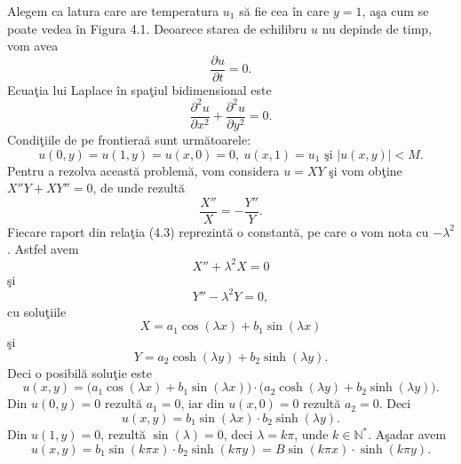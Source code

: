 \documentclass[a4paper,openany,12pt]{report}
\begin{document}
Alegem ca latura care are temperatura $u_1$ s\u a fie cea \^ in care $y=1$, a\c sa cum se poate vedea \^ in Figura 4.1. Deoarece starea de echilibru $u$ nu depinde de timp, vom avea
\begin{equation*}
\frac{\partial u}{\partial t}=0.
\end{equation*}
Ecua\c tia lui Laplace \^ in spa\c tiul bidimensional este
\begin{equation*}
\frac{\partial^2u}{\partial x^2}+\frac{\partial^2u}{\partial y^2}=0.
\end{equation*}
Condi\c tiile de pe frontiera\u a sunt urm\u atoarele:
\begin{equation*}
u(0,y)=u(1,y)=u(x,0)=0,\:  u(x, 1)=u_1 \text{ \c si } \left|u(x,y)\right|<M.
\end{equation*}
Pentru a rezolva aceast\u a problem\u a, vom considera $u=XY$ \c si vom ob\c tine $X''Y+XY''=0$, de unde rezult\u a
\begin{equation}
\frac{X''}{X}=-\frac{Y''}{Y}.
\end{equation}
Fiecare raport din rela\c tia (4.3) reprezint\u a o constant\u a, pe care o vom nota cu $-\lambda^2$. Astfel avem
\begin{equation*}
X''+\lambda^2X=0
\end{equation*}
\c si 
\begin{equation*}
Y''-\lambda^2Y=0, 
\end{equation*}
cu solu\c tiile
\begin{equation*}
X=a_1\cos(\lambda x)+b_1 \sin(\lambda x)
\end{equation*}
\c si 
\begin{equation*}
Y=a_2\cosh(\lambda y)+b_2 \sinh(\lambda y).
\end{equation*}
Deci o posibil\u a solu\c tie este
\begin{equation*}
u(x,y)=\big(a_1\cos(\lambda x)+b_1 \sin(\lambda x)\big)\cdot\big(a_2\cosh(\lambda y)+b_2 \sinh(\lambda y)\big).
\end{equation*}
Din $u(0,y)=0$ rezult\u a $a_1=0$, iar din $u(x, 0)=0$ rezult\u a $a_2=0$. Deci
\begin{equation*}
u(x,y)= b_1\sin(\lambda x)\cdot b_2 \sinh(\lambda y).
\end{equation*}
Din $u(1,y)=0$, rezult\u a $\sin(\lambda)=0$, deci $\lambda =k\pi$, unde $k\in \mathbb{N^*}$. A\c sadar avem
\begin{equation*}
u(x,y)=b_1\sin(k\pi x)\cdot b_2 \sinh(k \pi y)=B\sin(k\pi x)\cdot \sinh(k \pi y).
\end{equation*}
\end{document}
